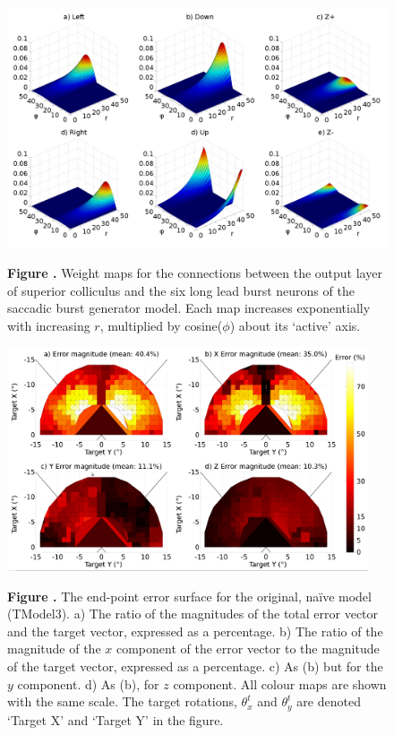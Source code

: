 \documentclass{frontiersSCNS}
\begin{document}
\begin{figure}[t]
\begin{center}
\includegraphics[width=\textwidth]{./figures/weightmaps.png}
\end{center}
\textbf{\label{weightmaps} Figure .}
{ Weight maps for the connections between the output layer of superior
colliculus and the six long lead burst neurons of the saccadic burst
generator model. Each map increases exponentially with increasing $r$,
multiplied by cosine($\phi$) about its `active' axis.}
\end{figure}

\begin{figure}[t]
\begin{center}
\includegraphics[width=0.95\textwidth]{./figures/errorsurface_TModel3.png}
\end{center}
\textbf{\label{errorsurfaceTM3} Figure .}
{ The end-point error surface for the original, na\"ive model
(TModel3). a) The ratio of the magnitudes of the total error vector
and the target vector, expressed as a percentage. b) The ratio of the
magnitude of the $x$ component of the error vector to the magnitude of
the target vector, expressed as a percentage. c) As (b) but for the
$y$ component. d) As (b), for $z$ component. All colour maps are shown
with the same scale. The target rotations, $\theta_{x}^t$ and
$\theta_{y}^t$ are denoted `Target X' and `Target Y' in the figure.}
\end{figure}
\end{document}
